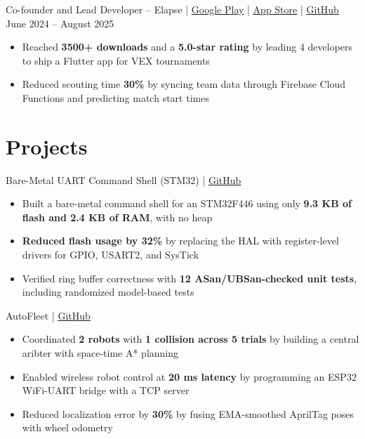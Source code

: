 \documentclass[11pt]{article}       %
\newcommand{\textsb}[1]{{\fontseries{sb}\selectfont #1}}
\begin{document}
\vspace{6pt}

\textsb{Co-founder and Lead Developer} -- Elapse | \href{https://play.google.com/store/apps/details?id=com.elapseapp.elapse_app&hl=en_CA}{\underline{Google Play}} | \href{https://apps.apple.com/ca/app/elapse/id6596757269}{\underline{App Store}} | \href{https://github.com/elapse-app/elapse}{\underline{GitHub}} \hfill June 2024 -- August 2025 \\
\begin{itemize}
    \item Reached \textbf{3500+ downloads} and a \textbf{5.0-star rating} by leading 4 developers to ship a Flutter app for VEX tournaments
    \item Reduced scouting time \textbf{30\%} by syncing team data through Firebase Cloud Functions and predicting match start times
\end{itemize}

\section*{Projects}

\textsb{Bare-Metal UART Command Shell (STM32)} | \href{https://github.com/LegendaryArk/terminal-controlled-stm}{\underline{GitHub}}
\begin{itemize}
    \item Built a bare-metal command shell for an STM32F446 using only \textbf{9.3 KB of flash and 2.4 KB of RAM}, with no heap
    \item \textbf{Reduced flash usage by 32\%} by replacing the HAL with register-level drivers for GPIO, USART2, and SysTick
    \item Verified ring buffer correctness with \textbf{12 ASan/UBSan-checked unit tests}, including randomized model-based tests
\end{itemize}

\vspace{6pt}

\textsb{AutoFleet} | \href{https://github.com/LegendaryArk/TIC_AutoFleet}{\underline{GitHub}}
\begin{itemize}
    \item Coordinated \textbf{2 robots} with \textbf{1 collision across 5 trials} by building a central aribter with space-time A* planning
    \item Enabled wireless robot control at \textbf{20 ms latency} by programming an ESP32 WiFi-UART bridge with a TCP server
    \item Reduced localization error by \textbf{30\%} by fusing EMA-smoothed AprilTag poses with wheel odometry
\end{itemize}
\end{document}
